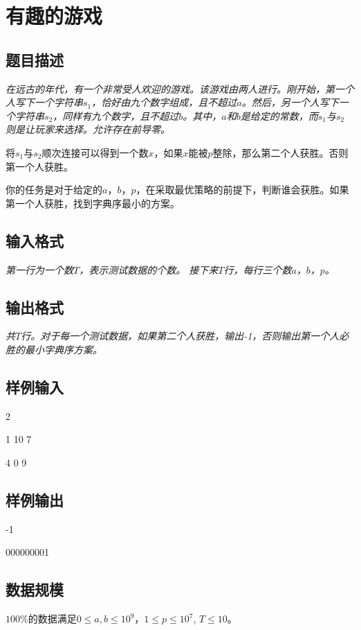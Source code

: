 \section{有趣的游戏}
\subsection{题目描述}
{\itshape
	在远古的年代，有一个非常受人欢迎的游戏。该游戏由两人进行。刚开始，第一个人写下一个字符串$s_1$，恰好由九个数字组成，且不超过$a$。然后，另一个人写下一个字符串$s_2$，同样有九个数字，且不超过$b$。其中，$a$和$b$是给定的常数，而$s_1$与$s_2$则是让玩家来选择。允许存在前导零。\par
	将$s_1$与$s_2$顺次连接可以得到一个数$x$，如果$x$能被$p$整除，那么第二个人获胜。否则第一个人获胜。\par
	你的任务是对于给定的$a$，$b$，$p$，在采取最优策略的前提下，判断谁会获胜。如果第一个人获胜，找到字典序最小的方案。
}
\subsection{输入格式}
{\itshape
	第一行为一个数$T$，表示测试数据的个数。
	接下来$T$行，每行三个数$a$，$b$，$p$。
}
\subsection{输出格式}
{\itshape
	共$T$行。对于每一个测试数据，如果第二个人获胜，输出-1，否则输出第一个人必胜的最小字典序方案。
}
\subsection{样例输入}
2 \par
1 10 7\par
4 0 9
\subsection{样例输出}
-1 \par
000000001
\subsection{数据规模}
$100\%$的数据满足$0 \le a,b \le 10^9$，$1 \le p \le 10^7$, {\color{red}$T \le 10$}。
